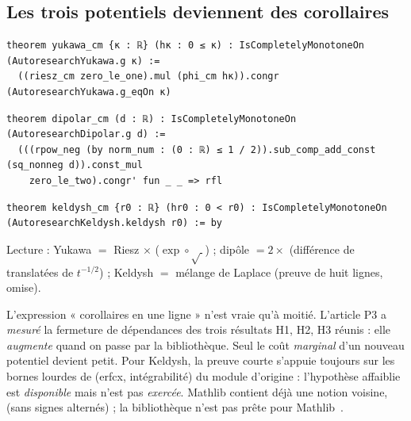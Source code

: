 \subsection{Les trois potentiels deviennent des corollaires}
\begin{leanbox}
\begin{lstlisting}[style=chdeux]
theorem yukawa_cm {κ : ℝ} (hκ : 0 ≤ κ) : IsCompletelyMonotoneOn (AutoresearchYukawa.g κ) :=
  ((riesz_cm zero_le_one).mul (phi_cm hκ)).congr (AutoresearchYukawa.g_eqOn κ)
\end{lstlisting}
\begin{lstlisting}[style=chdeux]
theorem dipolar_cm (d : ℝ) : IsCompletelyMonotoneOn (AutoresearchDipolar.g d) :=
  (((rpow_neg (by norm_num : (0 : ℝ) ≤ 1 / 2)).sub_comp_add_const (sq_nonneg d)).const_mul
    zero_le_two).congr' fun _ _ => rfl
\end{lstlisting}
\begin{lstlisting}[style=chdeux]
theorem keldysh_cm {r0 : ℝ} (hr0 : 0 < r0) : IsCompletelyMonotoneOn (AutoresearchKeldysh.keldysh r0) := by
\end{lstlisting}
\end{leanbox}
\noindent Lecture : Yukawa $=$ Riesz $\times$ ($\exp\circ\sqrt{\ }$) ; dipôle $=2\times$ (différence de translatées de
$t^{-1/2}$) ; Keldysh $=$ mélange de Laplace (preuve de huit lignes, omise).

\begin{warnbox}
L'expression « corollaires en une ligne » n'est vraie qu'à moitié. L'article P3 a \emph{mesuré} la fermeture de
dépendances des trois résultats H1, H2, H3 réunis : elle \emph{augmente} quand on passe par la bibliothèque. Seul le
coût \emph{marginal} d'un nouveau potentiel devient petit. Pour Keldysh, la preuve courte s'appuie toujours sur les
bornes lourdes de  (erfcx, intégrabilité) du module d'origine : l'hypothèse affaiblie est
\emph{disponible} mais n'est pas \emph{exercée}. Mathlib contient déjà une notion voisine, 
(sans signes alternés) ; la bibliothèque n'est pas prête pour Mathlib~\cite{p3}.
\end{warnbox}

